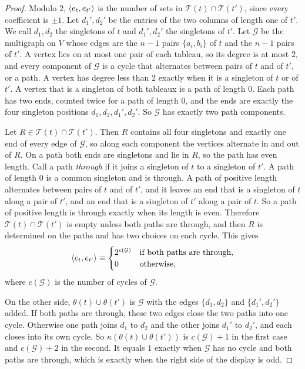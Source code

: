 \begin{proof}
Modulo $2$, $\langle e_t,e_{t'}\rangle$ is the number of sets in $\mathcal T(t)\cap\mathcal T(t')$, since every coefficient is $\pm1$. Let $d_1',d_2'$ be the entries of the two columns of length one of $t'$. We call $d_1,d_2$ the singletons of $t$ and $d_1',d_2'$ the singletons of $t'$. Let $\mathcal G$ be the multigraph on $V$ whose edges are the $n-1$ pairs $\{a_i,b_i\}$ of $t$ and the $n-1$ pairs of $t'$. A vertex lies on at most one pair of each tableau, so its degree is at most $2$, and every component of $\mathcal G$ is a cycle that alternates between pairs of $t$ and of $t'$, or a path. A vertex has degree less than $2$ exactly when it is a singleton of $t$ or of $t'$. A vertex that is a singleton of both tableaux is a path of length $0$. Each path has two ends, counted twice for a path of length $0$, and the ends are exactly the four singleton positions $d_1,d_2,d_1',d_2'$. So $\mathcal G$ has exactly two path components.

Let $R\in\mathcal T(t)\cap\mathcal T(t')$. Then $R$ contains all four singletons and exactly one end of every edge of $\mathcal G$, so along each component the vertices alternate in and out of $R$. On a path both ends are singletons and lie in $R$, so the path has even length. Call a path \emph{through} if it joins a singleton of $t$ to a singleton of $t'$. A path of length $0$ is a common singleton and is through. A path of positive length alternates between pairs of $t$ and of $t'$, and it leaves an end that is a singleton of $t$ along a pair of $t'$, and an end that is a singleton of $t'$ along a pair of $t$. So a path of positive length is through exactly when its length is even. Therefore $\mathcal T(t)\cap\mathcal T(t')$ is empty unless both paths are through, and then $R$ is determined on the paths and has two choices on each cycle. This gives
\[
\langle e_t,e_{t'}\rangle\equiv\begin{cases}2^{c(\mathcal G)}&\text{if both paths are through},\\0&\text{otherwise},\end{cases}
\]
where $c(\mathcal G)$ is the number of cycles of $\mathcal G$.

On the other side, $\theta(t)\cup\theta(t')$ is $\mathcal G$ with the edges $\{d_1,d_2\}$ and $\{d_1',d_2'\}$ added. If both paths are through, these two edges close the two paths into one cycle. Otherwise one path joins $d_1$ to $d_2$ and the other joins $d_1'$ to $d_2'$, and each closes into its own cycle. So $\kappa(\theta(t)\cup\theta(t'))$ is $c(\mathcal G)+1$ in the first case and $c(\mathcal G)+2$ in the second. It equals $1$ exactly when $\mathcal G$ has no cycle and both paths are through, which is exactly when the right side of the display is odd.
\end{proof}

